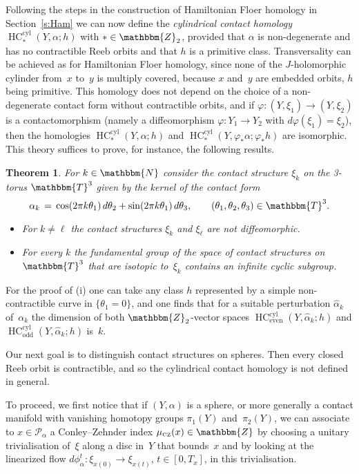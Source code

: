 \documentclass[12pt,twoside]{amsart}
\def\cyl{\operatorname{cyl}}
\theoremstyle{plain}
\newtheorem{theorem}{Theorem}[section]
\numberwithin{figure}{section}
\numberwithin{equation}{section}
\def\s{\smallskip}
\def\odd{\operatorname{odd}}
\def\even{\operatorname{even}}
\def\sCZ{ {\scriptscriptstyle\operatorname{CZ}}}
\def\HC{\operatorname{HC}}
\def\ga{\alpha}
\def\gf{\varphi}
\def\cp{{\mathcal P}}
\def\NN{\mathbbm{N}}
\def\TT{\mathbbm{T}}
\def\ZZ{\mathbbm{Z}}
\def\ni{\noindent}
\begin{document}
Following the steps in the construction of Hamiltonian Floer homology in Section~\ref{s:Ham}
we can now define the {\it cylindrical contact homology}\/ $\HC^{\cyl}_*(Y,\ga;h)$ with $* \in \ZZ_2$,
provided that $\ga$ is non-degenerate and has no contractible Reeb orbits and that $h$ is a primitive class.
Transversality can be achieved as for Hamiltonian Floer homology, since none of the $J$-holomorphic cylinder 
from~$x$ to~$y$ is multiply covered,
because $x$ and~$y$ are embedded orbits, $h$ being primitive.
This homology does not depend on the choice of a non-degenerate contact form without contractible orbits, 
and if $\gf \colon (Y,\xi_1) \to (Y,\xi_2)$ is a contactomorphism (namely a diffeomorphism 
$\gf \colon Y_1 \to Y_2$ with $d\gf (\xi_1) = \xi_2$), 
then the homologies $\HC^{\cyl}_*(Y,\ga;h)$ and  $\HC^{\cyl}_*(Y,\gf_*\ga;\gf_*h)$ are isomorphic.
%
This theory suffices to prove, for instance, the following results.


\begin{theorem} \label{t:CZ}
For $k \in \NN$ consider the contact structure $\xi_k$ on the 3-torus $\TT^3$
given by the kernel of the contact form
$$
\ga_k \,=\, \cos (2\pi k \theta_1) \,d \theta_2 + \sin (2\pi k \theta_1) \,d \theta_3,
\qquad (\theta_1, \theta_2, \theta_3) \in \TT^3 .
$$
\begin{itemize}
\item[\rm (i)]
For $k \neq \ell$
the contact structures $\xi_k$ and $\xi_\ell$ are not diffeomorphic. 

\s \ni
\item[\rm (ii)]
For every $k$
the fundamental group of the space of contact structures on~$\TT^3$ that are isotopic to~$\xi_k$
contains an infinite cyclic subgroup. 
\end{itemize}
\end{theorem}

For the proof of (i) one can take any class $h$ represented by a simple non-contractible curve in $\{ \theta_1 = 0\}$,
and one finds that for a suitable perturbation $\hat{\ga}_k$ of~$\ga_k$
the dimension of both $\ZZ_2$-vector spaces $\HC^{\cyl}_{\even}(Y,\hat{\ga}_k;h)$ 
and $\HC^{\cyl}_{\odd}(Y,\hat{\ga}_k;h)$ is~$k$.

\s
Our next goal is to distinguish contact structures on spheres.
Then every closed Reeb orbit is contractible, and so 
the cylindrical contact homology is not defined in general.

To proceed, we first notice that if $(Y,\ga)$ is a sphere, 
or more generally a contact manifold with vanishing homotopy groups $\pi_1(Y)$ and~$\pi_2(Y)$, 
we can associate to $x \in \cp_\ga$ a Conley--Zehnder index $\mu_{\sCZ}(x) \in \ZZ$
by choosing a unitary trivialisation of~$\xi$ along a disc in~$Y$ that bounds~$x$ and 
by looking at the linearized flow $d \phi_{\ga}^t \colon \xi_{x(0)} \to \xi_{x (t)}$, 
$t \in [0,T_x]$, in this trivialisation.
\end{document}
